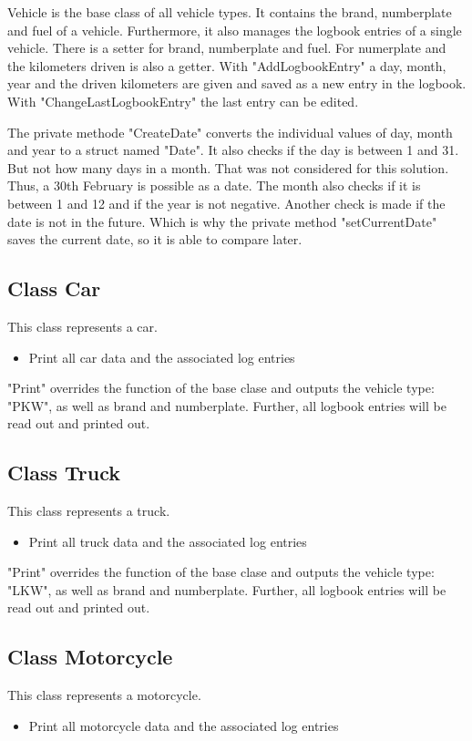 Vehicle is the base class of all vehicle types. It contains the brand, numberplate and fuel of a vehicle.
Furthermore, it also manages the logbook entries of a single vehicle.
There is a setter for brand, numberplate and fuel. For numerplate and the kilometers driven is also a getter.
With "AddLogbookEntry" a day, month, year and the driven kilometers are given and saved as a new entry in the logbook.
With "ChangeLastLogbookEntry" the last entry can be edited.

The private methode "CreateDate" converts the individual values of day, month and year to a struct named "Date".
It also checks if the day is between 1 and 31. But not how many days in a month. That was
not considered for this solution. Thus, a 30th February is possible as a date.
The month also checks if it is between 1 and 12 and if the year is not negative.
Another check is made if the date is not in the future. Which is why the private method "setCurrentDate" saves the current date, so it
is able to compare later.

\subsection{Class Car}
This class represents a car.
\begin{itemize}
	\item Print all car data and the associated log entries
\end{itemize}

"Print" overrides the function of the base clase and outputs the vehicle type: "PKW", as well as brand and numberplate.
Further, all logbook entries will be read out and printed out.

\subsection{Class Truck}
This class represents a truck.
\begin{itemize}
	\item Print all truck data and the associated log entries
\end{itemize}

"Print" overrides the function of the base clase and outputs the vehicle type: "LKW", as well as brand and numberplate.
Further, all logbook entries will be read out and printed out.

\subsection{Class Motorcycle}
This class represents a motorcycle.
\begin{itemize}
	\item Print all motorcycle data and the associated log entries
\end{itemize}

